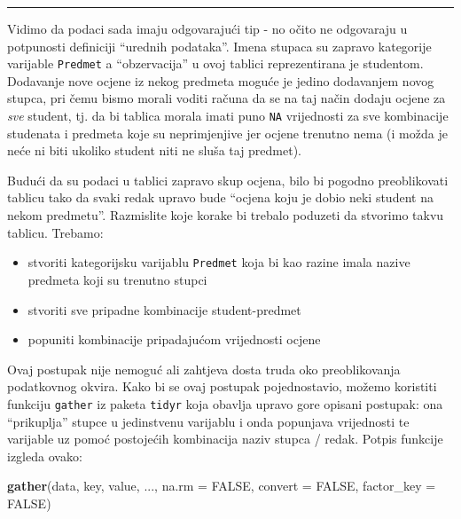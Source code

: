 \documentclass[]{book}
\newenvironment{Shaded}{\begin{snugshade}}{\end{snugshade}}
\newcommand{\KeywordTok}[1]{\textcolor[rgb]{0.13,0.29,0.53}{\textbf{#1}}}
\newcommand{\DataTypeTok}[1]{\textcolor[rgb]{0.13,0.29,0.53}{#1}}
\newcommand{\OtherTok}[1]{\textcolor[rgb]{0.56,0.35,0.01}{#1}}
\newcommand{\NormalTok}[1]{#1}
\providecommand{\tightlist}{%
  \setlength{\itemsep}{0pt}\setlength{\parskip}{0pt}}
\theoremstyle{definition}
\theoremstyle{definition}
\theoremstyle{definition}
\theoremstyle{remark}
\begin{document}
\begin{center}\rule{0.5\linewidth}{\linethickness}\end{center}

Vidimo da podaci sada imaju odgovarajući tip - no očito ne odgovaraju u
potpunosti definiciji ``urednih podataka''. Imena stupaca su zapravo
kategorije varijable \texttt{Predmet} a ``obzervacija'' u ovoj tablici
reprezentirana je studentom. Dodavanje nove ocjene iz nekog predmeta
moguće je jedino dodavanjem novog stupca, pri čemu bismo morali voditi
računa da se na taj način dodaju ocjene za \emph{sve} student, tj. da bi
tablica morala imati puno \texttt{NA} vrijednosti za sve kombinacije
studenata i predmeta koje su neprimjenjive jer ocjene trenutno nema (i
možda je neće ni biti ukoliko student niti ne sluša taj predmet).

Budući da su podaci u tablici zapravo skup ocjena, bilo bi pogodno
preoblikovati tablicu tako da svaki redak upravo bude ``ocjena koju je
dobio neki student na nekom predmetu''. Razmislite koje korake bi
trebalo poduzeti da stvorimo takvu tablicu. Trebamo:

\begin{itemize}
\tightlist
\item
  stvoriti kategorijsku varijablu \texttt{Predmet} koja bi kao razine
  imala nazive predmeta koji su trenutno stupci
\item
  stvoriti sve pripadne kombinacije student-predmet
\item
  popuniti kombinacije pripadajućom vrijednosti ocjene
\end{itemize}

Ovaj postupak nije nemoguć ali zahtjeva dosta truda oko preoblikovanja
podatkovnog okvira. Kako bi se ovaj postupak pojednostavio, možemo
koristiti funkciju \texttt{gather} iz paketa \texttt{tidyr} koja obavlja
upravo gore opisani postupak: ona ``prikuplja'' stupce u jedinstvenu
varijablu i onda popunjava vrijednosti te varijable uz pomoć postojećih
kombinacija naziv stupca / redak. Potpis funkcije izgleda ovako:

\begin{Shaded}
\begin{Highlighting}[]
\KeywordTok{gather}\NormalTok{(data, key, value, ..., }\DataTypeTok{na.rm =} \OtherTok{FALSE}\NormalTok{, }\DataTypeTok{convert =} \OtherTok{FALSE}\NormalTok{, }\DataTypeTok{factor_key =} \OtherTok{FALSE}\NormalTok{)}
\end{Highlighting}
\end{Shaded}
\end{document}
